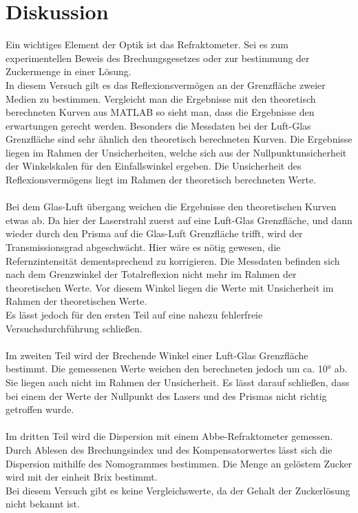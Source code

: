 \documentclass[12pt,a4paper,twoside]{article}
\begin{document}
\section{Diskussion} %
Ein wichtiges Element der Optik ist das Refraktometer. Sei es zum experimentellen Beweis des Brechungsgesetzes oder zur bestimmung der Zuckermenge in einer Lösung. 
\\
In diesem Versuch gilt es das Reflexionsvermögen an der Grenzfläche zweier Medien zu bestimmen. 
Vergleicht man die Ergebnisse mit den theoretisch berechneten Kurven aus MATLAB so sieht man, dass die Ergebnisse den erwartungen gerecht werden. 
Besonders die Messdaten bei der Luft-Glas Grenzfläche sind sehr ähnlich den theoretisch berechneten Kurven. 
Die Ergebnisse liegen im Rahmen der Unsicherheiten, welche sich aus der Nullpunktunsicherheit der Winkelskalen für den Einfallswinkel ergeben. 
Die Unsicherheit des Reflexionsvermögens liegt im Rahmen der theoretisch berechneten Werte. 
\\
\\
Bei dem Glas-Luft übergang weichen die Ergebnisse den theoretischen Kurven etwas ab. Da hier der Laserstrahl zuerst auf eine Luft-Glas Grenzfläche, und dann wieder durch den Prisma auf die Glas-Luft Grenzfläche trifft, 
wird der Transmissionsgrad abgeschwächt. Hier wäre es nötig gewesen, die Refernzintensität dementsprechend zu korrigieren. 
Die Messdaten befinden sich nach dem Grenzwinkel der Totalreflexion nicht mehr im Rahmen der theoretischen Werte. 
Vor diesem Winkel liegen die Werte mit Unsicherheit im Rahmen der theoretischen Werte.  
\\
Es lässt jedoch für den ersten Teil auf eine nahezu fehlerfreie Versuchsdurchführung schließen. 
\\
\\
Im zweiten Teil wird der Brechende Winkel einer Luft-Glas Grenzfläche bestimmt. 
Die gemessenen Werte weichen den berechneten jedoch um ca. 10° ab. Sie liegen auch nicht im Rahmen der Unsicherheit. 
Es lässt darauf schließen, dass bei einem der Werte der Nullpunkt des Lasers und des Prismas nicht richtig getroffen wurde. 
\\
\\
Im dritten Teil wird die Dispersion mit einem Abbe-Refraktometer gemessen. 
Durch Ablesen des Brechungsindex und des Kompensatorwertes lässt sich die Dispersion mithilfe des Nomogrammes bestimmen. 
Die Menge an gelöstem Zucker wird mit der einheit Brix bestimmt. \\
Bei diesem Versuch gibt es keine Vergleichswerte, da der Gehalt der Zuckerlösung nicht bekannt ist. 
 
\end{document}
